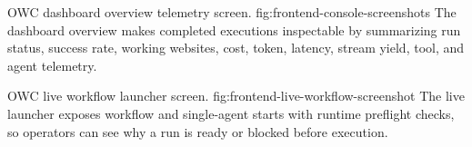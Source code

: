   {OWC dashboard overview telemetry screen.}
  {fig:frontend-console-screenshots}
  {The dashboard overview makes completed executions inspectable by summarizing run
  status, success rate, working websites, cost, token, latency, stream yield, tool, and
  agent telemetry.}

  {OWC live workflow launcher screen.}
  {fig:frontend-live-workflow-screenshot}
  {The live launcher exposes workflow and single-agent starts with runtime preflight checks,
  so operators can see why a run is ready or blocked before execution.}
